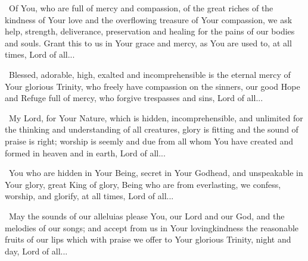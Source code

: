 \documentclass[12pt,twoside,a5paper]{article}
\begin{document}
\cc~Of You, who are full of mercy and compassion, of the great riches of the kindness of Your love and the overflowing treasure of Your compassion, we ask help, strength, deliverance, preservation and healing for the pains of our bodies and souls. Grant this to us in Your grace and mercy, as You are used to, at all times, Lord of all...

\cc~Blessed, adorable, high, exalted and incomprehensible is the eternal mercy of Your glorious Trinity, who freely have compassion on the sinners, our good Hope and Refuge full of mercy, who forgive trespasses and sins, Lord of all...




\cc~My Lord, for Your Nature, which is hidden, incomprehensible, and unlimited for the thinking and understanding of all creatures, glory is fitting and the sound of praise is right; worship is seemly and due from all whom You have created and formed in heaven and in earth, Lord of all...



\begin{halfparskip}
   

  \cc~You who are hidden in Your Being, secret in Your Godhead, and unspeakable in Your glory, great King of glory, Being who are from everlasting, we confess, worship, and glorify, at all times, Lord of all...
\end{halfparskip}

\begin{halfparskip}
   

  \cc~May the sounds of our alleluias please You, our Lord and our God, and the melodies of our songs; and accept from us in Your lovingkindness the reasonable fruits of our lips which with praise we offer to Your glorious Trinity, night and day, Lord of all...
\end{halfparskip}
\end{document}
